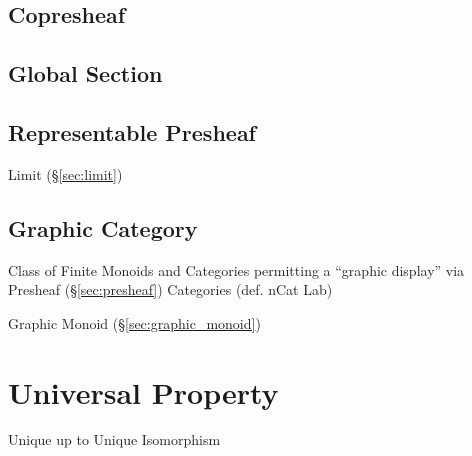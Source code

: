 \subsection{Copresheaf}\label{sec:copresheaf}

\subsection{Global Section}\label{sec:global_section}

\subsection{Representable Presheaf}\label{sec:representable_presheaf}

Limit (\S\ref{sec:limit})



\subsection{Graphic Category}\label{sec:graphic_category}

Class of Finite Monoids and Categories permitting a ``graphic
display'' via Presheaf (\S\ref{sec:presheaf}) Categories
(def. nCat Lab) %

Graphic Monoid (\S\ref{sec:graphic_monoid})



\section{Universal Property}\label{sec:universal_property}

Unique up to Unique Isomorphism



